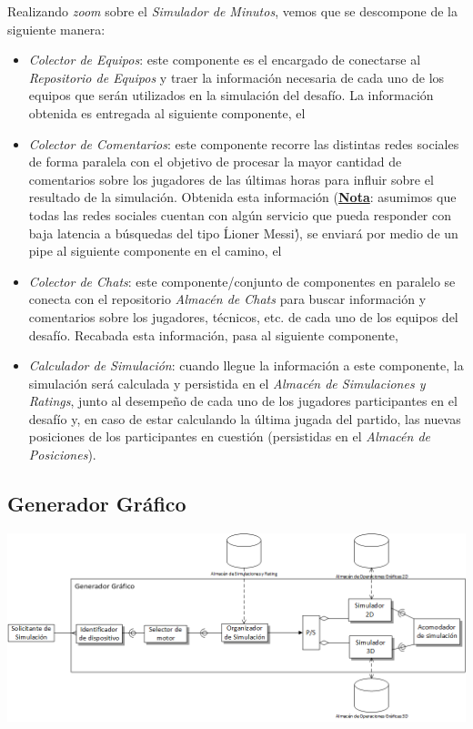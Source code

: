 Realizando \emph{zoom} sobre el \emph{Simulador de Minutos}, vemos que se descompone de la siguiente manera:
\begin{itemize}
 \item \emph{Colector de Equipos}: este componente es el encargado de conectarse al \emph{Repositorio de Equipos} y traer la información necesaria de cada uno de los equipos que serán utilizados en la simulación del desafío. La información obtenida es entregada al siguiente componente, el
 \item \emph{Colector de Comentarios}: este componente recorre las distintas redes sociales de forma paralela con el objetivo de procesar la mayor cantidad de comentarios sobre los jugadores de las últimas horas para influir sobre el resultado de la simulación. Obtenida esta información (\textbf{\underline{Nota}}: asumimos que todas las redes sociales cuentan con algún servicio que pueda responder con baja latencia a búsquedas del tipo \'Lioner Messi\'), se enviará por medio de un pipe al siguiente componente en el camino, el
 \item \emph{Colector de Chats}: este componente/conjunto de componentes en paralelo se conecta con el repositorio \emph{Almacén de Chats} para buscar información y comentarios sobre los jugadores, técnicos, etc. de cada uno de los equipos del desafío. Recabada esta información, pasa al siguiente componente,
 \item \emph{Calculador de Simulación}: cuando llegue la información a este componente, la simulación será calculada y persistida en el \emph{Almacén de Simulaciones y Ratings}, junto al desempeño de cada uno de los jugadores participantes en el desafío y, en caso de estar calculando la última jugada del partido, las nuevas posiciones de los participantes en cuestión (persistidas en el \emph{Almacén de Posiciones}).
\end{itemize}


\newpage
\subsection{Generador Gráfico}
\begin{center}
\includegraphics[scale=0.86,angle=90]{diagramas/generador_grafico}
\label{fig:generador_grafico}
\end{center}

